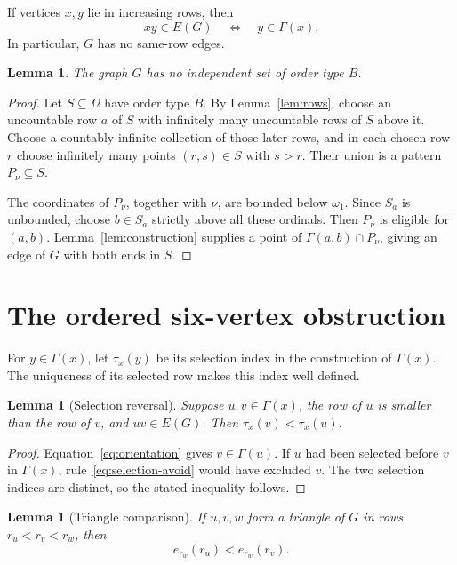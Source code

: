\documentclass[10pt,letterpaper,leqno]{amsart}
\numberwithin{equation}{section}
\newtheorem{lemma}[theorem]{Lemma}
\theoremstyle{definition}
\theoremstyle{remark}
\newcommand{\Gam}{\Gamma}
\begin{document}
If vertices $x,y$ lie in increasing rows, then
\begin{equation}\label{eq:orientation}
 xy\in E(G)\quad\Longleftrightarrow\quad y\in\Gam(x).
\end{equation}
In particular, $G$ has no same-row edges.

\begin{lemma}\label{lem:no-red}
The graph $G$ has no independent set of order type $B$.
\end{lemma}

\begin{proof}
Let $S\subseteq\Omega$ have order type $B$.
By Lemma~\ref{lem:rows}, choose an uncountable row $a$ of $S$ with
infinitely many uncountable rows of $S$ above it.
Choose a countably infinite collection of those later rows, and in each
chosen row $r$ choose infinitely many points $(r,s)\in S$ with $s>r$.
Their union is a pattern $P_\nu\subseteq S$.

The coordinates of $P_\nu$, together with $\nu$, are bounded below
$\omega_1$. Since $S_a$ is unbounded, choose $b\in S_a$ strictly above
all these ordinals. Then $P_\nu$ is eligible for $(a,b)$.
Lemma~\ref{lem:construction} supplies a point of
$\Gam(a,b)\cap P_\nu$, giving an edge of $G$ with both ends in $S$.
\end{proof}

\section{The ordered six-vertex obstruction}

For $y\in\Gam(x)$, let $\tau_x(y)$ be its selection index in the
construction of $\Gam(x)$. The uniqueness of its selected row makes
this index well defined.

\begin{lemma}[Selection reversal]\label{lem:reversal}
Suppose $u,v\in\Gam(x)$, the row of $u$ is smaller than the row of $v$,
and $uv\in E(G)$. Then $\tau_x(v)<\tau_x(u)$.
\end{lemma}

\begin{proof}
Equation~\eqref{eq:orientation} gives $v\in\Gam(u)$.
If $u$ had been selected before $v$ in $\Gam(x)$,
rule~\eqref{eq:selection-avoid} would have excluded $v$.
The two selection indices are distinct, so the stated inequality follows.
\end{proof}

\begin{lemma}[Triangle comparison]\label{lem:triangle}
If $u,v,w$ form a triangle of $G$ in rows $r_u<r_v<r_w$, then
\begin{equation}\label{eq:triangle}
 e_{r_w}(r_u)<e_{r_w}(r_v).
\end{equation}
\end{lemma}
\end{document}
